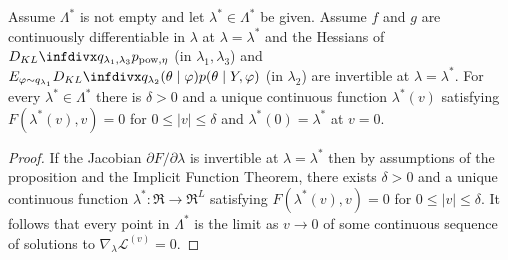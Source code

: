 \begin{proposition}\label{prop:use_IFT_show_loss_limit}
  Assume $\Lambda^*$ is not empty and let $\lambda^*\in \Lambda^*$ be given. Assume $f$ and $g$ are continuously differentiable in $\lambda$ at $\lambda=\lambda^*$ and the Hessians of $\kl{q_{\lambda_1,\lambda_3}}{p_{\pow, \eta}}$ (in $\lambda_1,\lambda_3$) and $E_{\varphi\sim q_{\lambda_1}}\kl{q_{\lambda_2}(\theta\mid \varphi)}{p(\theta \mid Y,\varphi)}$ (in $\lambda_2$) are invertible at $\lambda=\lambda^*$. For every $\lambda^*\in\Lambda^*$ there is $\delta>0$ and a unique continuous function $\lambda^*(v)$ satisfying $F(\lambda^*(v),v)=0$ for $0\le |v|\le \delta$ and $\lambda^*(0)=\lambda^*$ at $v=0$.
\end{proposition}
\begin{proof}
  If the Jacobian $\partial F/\partial \lambda$ is invertible at $\lambda=\lambda^*$ then by assumptions of the proposition and the Implicit Function Theorem, there exists $\delta>0$ and a unique continuous function $\lambda^*: \Re\to\Re^L$ satisfying $F(\lambda^*(v),v)=0$ for $0\le |v|\le \delta$. It follows that every point in $\Lambda^*$ is the limit as $v\to 0$ of some continuous sequence of solutions to $\nabla_\lambda\mathcal{L}^{(v)}=0$.


\end{proof}
